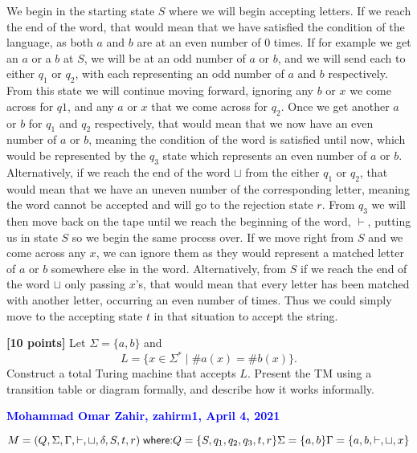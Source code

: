 \documentclass[11pt,fleqn]{article}
\newcommand{\mname}[1]{\mbox{\sf #1}}
\newcommand{\set}[1]{{\{ #1 \}}}
\begin{document}
  We begin in the starting state $S$ where we will begin accepting letters. If we reach the end of the word, that would mean that we have satisfied the condition of the language, as both $a$ and $b$ are at an even number of 0 times. If for example we get an $a$ or a $b$ at $S$, we will be at an odd number of $a$ or $b$, and we will send each to either $q_1$ or $q_2$, with each representing an odd number of $a$ and $b$ respectively. From this state we will continue moving forward, ignoring any $b$ or $x$ we come across for $q1$, and any $a$ or $x$ that we come across for $q_2$. Once we get another $a$ or $b$ for $q_1$ and $q_2$ respectively, that would mean that we now have an even number of $a$ or $b$, meaning the condition of the word is satisfied until now, which would be represented by the $q_3$ state which represents an even number of $a$ or $b$. Alternatively, if we reach the end of the word $\sqcup$ from the either $q_1$ or $q_2$, that would mean that we have an uneven number of the corresponding letter, meaning the word cannot be accepted and will go to the rejection state $r$. From $q_3$ we will then move back on the tape until we reach the beginning of the word, $\vdash$, putting us in state $S$ so we begin the same process over. If we move right from $S$ and we come across any $x$, we can ignore them as they would represent a matched letter of $a$ or $b$ somewhere else in the word. Alternatively, from $S$ if we reach the end of the word $\sqcup$ only passing $x$'s, that would mean that every letter has been matched with another letter, occurring an even number of times. Thus we could simply move to the accepting state $t$ in that situation to accept the string. 

  \item \textbf{[10 points]} Let $\Sigma = \set{a,b}$ and \[L = \set{x
    \in \Sigma^* \mid \#a(x) = \#b(x)}.\] Construct a total Turing
    machine that accepts $L$.  Present the TM using a transition table
    or diagram formally, and describe how it works informally.

  \bigskip

  \textcolor{blue}{\textbf{Mohammad Omar Zahir, zahirm1, April 4, 2021}}

  $M = (Q,\Sigma,\Gamma,\vdash,\sqcup,\delta,S,t,r)\;
    \mname{where:}\\
    Q = \{S,q_1,q_2,q_3,t,r\}\\ 
    \Sigma = \{a,b\}\\
    \Gamma = \{a,b,\vdash,\sqcup,x\}\\
    $
\end{document}
